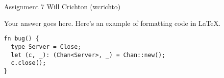 \documentclass[11pt]{article}
\begin{document}
\hwtitle
  {Assignment 7}
  {Will Crichton (wcrichto)} %


Your answer goes here. Here's an example of formatting code in LaTeX.

\begin{verbatim}
fn bug() {
  type Server = Close;
  let (c, _): (Chan<Server>, _) = Chan::new();
  c.close();
}
\end{verbatim}



\end{document}
